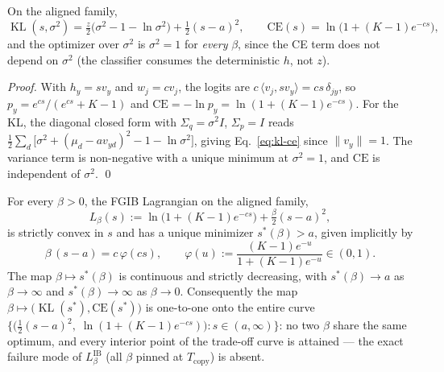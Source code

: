 \begin{lemma}\label{lem:lagrangian}
On the aligned family,
\begin{equation}
\operatorname{KL}(s, \sigma^2)
= \tfrac{z}{2}\big(\sigma^2 - 1 - \ln\sigma^2\big) + \tfrac{1}{2}(s-a)^2,
\qquad
\mathrm{CE}(s) = \ln\!\big(1 + (K-1)e^{-cs}\big),
\label{eq:kl-ce}
\end{equation}
and the optimizer over $\sigma^2$ is $\sigma^2 = 1$ for \emph{every} $\beta$, since the
CE term does not depend on $\sigma^2$ (the classifier consumes the deterministic $h$,
not $z$).
\end{lemma}

\begin{proof}
With $h_y = s v_y$ and $w_j = c v_j$, the logits are $c\,\langle v_j, s v_y\rangle
= cs\,\delta_{jy}$, so $p_y = e^{cs}/(e^{cs} + K - 1)$ and
$\mathrm{CE} = -\ln p_y = \ln(1 + (K-1)e^{-cs})$.
For the KL, the diagonal closed form with $\Sigma_q = \sigma^2 I$, $\Sigma_p = I$ reads
$\tfrac{1}{2}\sum_d\big[\sigma^2 + (\mu_d - a v_{yd})^2 - 1 - \ln\sigma^2\big]$, giving
Eq.~\eqref{eq:kl-ce} since $\|v_y\| = 1$. The variance term is non-negative with a
unique minimum at $\sigma^2 = 1$, and $\mathrm{CE}$ is independent of $\sigma^2$.
\hfill\qed
\end{proof}

\begin{proposition}\label{prop:sweep}
For every $\beta > 0$, the FGIB Lagrangian on the aligned family,
\begin{equation}
L_\beta(s) := \ln\!\big(1 + (K-1)e^{-cs}\big) + \tfrac{\beta}{2}(s-a)^2,
\label{eq:fgib-lag}
\end{equation}
is strictly convex in $s$ and has a unique minimizer $s^*(\beta) > a$, given implicitly
by
\begin{equation}
\beta\,(s-a) = c\,\varphi(cs),
\qquad
\varphi(u) := \frac{(K-1)e^{-u}}{1 + (K-1)e^{-u}} \in (0,1) .
\label{eq:stationarity}
\end{equation}
The map $\beta \mapsto s^*(\beta)$ is continuous and strictly decreasing, with
$s^*(\beta) \to a$ as $\beta \to \infty$ and $s^*(\beta) \to \infty$ as $\beta \to 0$.
Consequently the map $\beta \mapsto \big(\operatorname{KL}(s^*), \mathrm{CE}(s^*)\big)$
is one-to-one onto the entire curve
$\{\big(\tfrac{1}{2}(s-a)^2,\; \ln(1+(K-1)e^{-cs})\big) : s \in (a, \infty)\}$: no two
$\beta$ share the same optimum, and every interior point of the trade-off curve is
attained --- the exact failure mode of $L^{\mathrm{IB}}_\beta$ (all $\beta$ pinned at
$T_{\mathrm{copy}}$) is absent.
\end{proposition}


